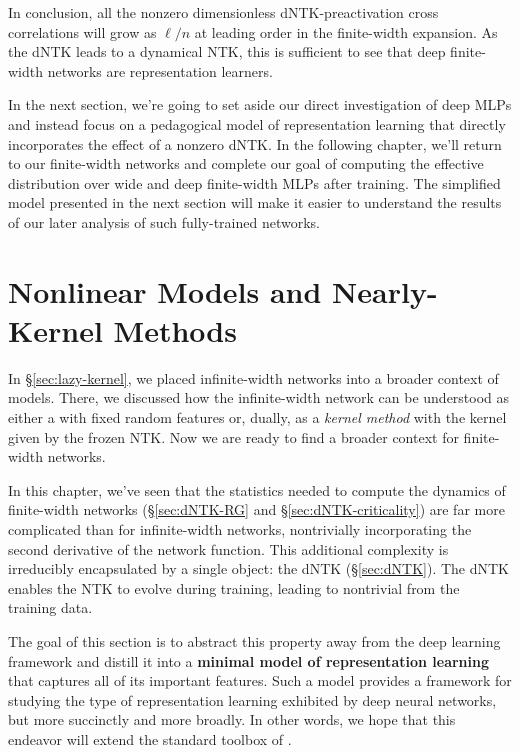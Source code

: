 \sbreak

In conclusion, all the nonzero dimensionless dNTK-preactivation cross correlations will grow as $\ell/n$ at leading order in the finite-width expansion. As the dNTK leads to a dynamical NTK, this is sufficient to see that deep finite-width networks are representation learners.


In the next section, we're going to set aside our direct investigation of deep MLPs and instead focus on a pedagogical model of representation learning that directly incorporates the effect of a nonzero dNTK. In the following chapter, we'll return to our finite-width networks and complete our goal of computing the effective distribution over wide and deep finite-width MLPs after training. The simplified model presented in the next section will make it easier to understand the results of our later analysis of such fully-trained networks.






\section{Nonlinear Models and Nearly-Kernel Methods}\label{sec:nonlinear-model}
In \S\ref{sec:lazy-kernel}, we placed infinite-width networks into a broader context of  models. There, we discussed how the infinite-width network can be understood as either a  with fixed random features or, dually, as a \emph{kernel method} with the kernel given by the frozen NTK. 
Now we are ready to find a broader context for finite-width networks.


In this chapter, we've seen that the statistics needed to compute the dynamics of finite-width networks (\S\ref{sec:dNTK-RG} and \S\ref{sec:dNTK-criticality}) are far more complicated than for infinite-width networks, nontrivially incorporating the second derivative of the network function. This additional complexity is irreducibly encapsulated by a single object: the dNTK (\S\ref{sec:dNTK}).
The dNTK enables the NTK to evolve during training, 
leading to nontrivial   from the training data. 

The goal of this section is to abstract this property away from the deep learning framework and distill it into a \textbf{minimal model of representation learning} that captures all of its important features.
Such a model provides a framework for studying the type of representation learning exhibited by deep neural networks, but more succinctly and more broadly.
In other words, we hope that this endeavor will %
extend the standard toolbox of .

